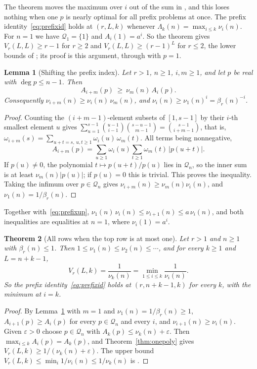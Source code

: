 \documentclass[11pt]{article}
\newtheorem{theorem}{Theorem}[section]
\newtheorem{lemma}[theorem]{Lemma}
\begin{document}
The theorem moves the maximum over $i$ out of the sum in
\cite[Theorem~3.3]{coefficient-mass-rows}, and this loses nothing when one $p$ is nearly
optimal for all prefix problems at once.  The prefix identity~\eqref{eq:prefixid} holds at $(r,L,k)$ whenever
$\Lambda_k(n)=\max_{i\le k}\nu_i(n)$.  For $n=1$ we have
$\mathcal Q_1=\{1\}$ and $A_i(1)=a^i$.  So the theorem gives
$V_r(L,L)\ge r-1$ for $r\ge2$ and $V_r(L,L)\ge(r-1)^L$ for $r\le2$, the
lower bounds of \cite[Corollary~2.4]{coefficient-mass-rows}; its proof is this argument,
through \cite[Lemma~4.4]{coefficient-mass-rows} with $p=1$.

\begin{lemma}[Shifting the prefix index]\label{lem:prefixshift}
Let $r>1$, $n\ge1$, $i,m\ge1$, and let $p$ be real with $\deg p\le n-1$.
Then
\[
  A_{i+m}(p)\ \ge\ \nu_m(n)\,A_i(p).
\]
Consequently $\nu_{i+m}(n)\ge\nu_i(n)\,\nu_m(n)$, and
$\nu_i(n)\ge\nu_1(n)^i=\beta_r(n)^{-i}$.
\end{lemma}

\begin{proof}
Counting the $(i+m-1)$-element subsets of $[1,s-1]$ by their $i$-th
smallest element $u$ gives
$\sum_{u=1}^{s-1}\binom{u-1}{i-1}\binom{s-u-1}{m-1}=\binom{s-1}{i+m-1}$, that is,
$\omega_{i+m}(s)=\sum_{u+t=s,\ u,t\ge1}\omega_i(u)\,\omega_m(t)$.  All terms
being nonnegative,
\[
  A_{i+m}(p)=\sum_{u\ge1}\omega_i(u)\sum_{t\ge1}\omega_m(t)\,|p(u+t)| .
\]
If $p(u)\ne0$, the polynomial $t\mapsto p(u+t)/p(u)$ lies in $\mathcal Q_n$,
so the inner sum is at least $\nu_m(n)|p(u)|$; if $p(u)=0$ this is trivial.
This proves the inequality.  Taking the infimum over $p\in\mathcal Q_n$
gives $\nu_{i+m}(n)\ge\nu_m(n)\nu_i(n)$, and $\nu_1(n)=1/\beta_r(n)$.
\end{proof}

Together with~\eqref{eq:prefixup},
$\nu_1(n)\,\nu_i(n)\le\nu_{i+1}(n)\le a\,\nu_i(n)$, and both inequalities are
equalities at $n=1$, where $\nu_i(1)=a^i$.

\begin{theorem}[All rows when the top row is at most one]\label{thm:onepolyrows}
Let $r>1$ and $n\ge1$ with $\beta_r(n)\le1$.  Then
$1\le\nu_1(n)\le\nu_2(n)\le\cdots$, and for every $k\ge1$ and $L=n+k-1$,
\[
  V_r(L,k)=\frac1{\nu_k(n)}=\min_{1\le i\le k}\frac1{\nu_i(n)} .
\]
So the prefix identity~\eqref{eq:prefixid} holds at $(r,n+k-1,k)$
for every $k$, with the minimum at $i=k$.
\end{theorem}

\begin{proof}
By Lemma~\ref{lem:prefixshift} with $m=1$ and $\nu_1(n)=1/\beta_r(n)\ge1$,
$A_{i+1}(p)\ge A_i(p)$ for every $p\in\mathcal Q_n$ and every $i$, and
$\nu_{i+1}(n)\ge\nu_i(n)$.  Given $\varepsilon>0$ choose $p\in\mathcal Q_n$
with $A_k(p)\le\nu_k(n)+\varepsilon$.  Then
$\max_{i\le k}A_i(p)=A_k(p)$, and Theorem~\ref{thm:onepoly} gives
$V_r(L,k)\ge1/(\nu_k(n)+\varepsilon)$.  The upper bound
$V_r(L,k)\le\min_i1/\nu_i(n)\le1/\nu_k(n)$ is \cite[Theorem~3.3]{coefficient-mass-rows}.
\end{proof}
\end{document}

